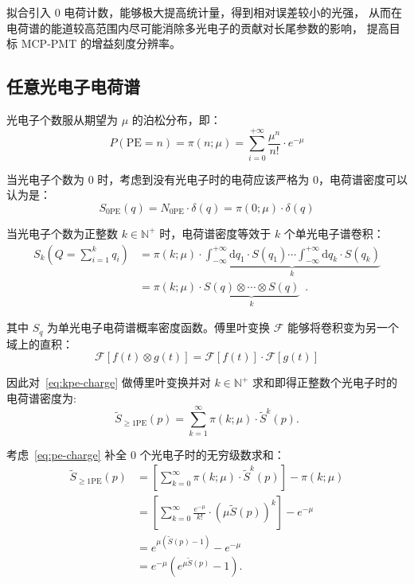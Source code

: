 拟合引入 0 电荷计数，能够极大提高统计量，得到相对误差较小的光强，
从而在电荷谱的能道较高范围内尽可能消除多光电子的贡献对长尾参数的影响，
提高目标 MCP-PMT 的增益刻度分辨率。

\subsection{任意光电子电荷谱}\label{sec:dft}

光电子个数服从期望为 $\mu$ 的泊松分布，即：
\begin{equation}
    P(\text{PE}=n) = \pi(n;\mu)=\sum_{i=0}^{+\infty}\frac{\mu^{n}}{n!}\cdot e^{-\mu}
\end{equation}

当光电子个数为 0 时，考虑到没有光电子时的电荷应该严格为 0，电荷谱密度可以认为是：
\begin{equation}
    S_{0\text{PE}}(q)=N_{0\text{PE}}\cdot\delta(q)=\pi(0;\mu)\cdot\delta(q)
\end{equation}

当光电子个数为正整数 $k\in\mathbb{N}^{+}$ 时，电荷谱密度等效于 $k$ 个单光电子谱卷积：
\begin{align}
    S_{k}(Q = \sum_{i = 1}^{k} q_i ) 
    & = \pi(k;\mu)\cdot\underbrace{
    \int_{-\infty }^{+\infty}\mathrm{d}q_1\cdot S(q_1)
    \cdots \int_{-\infty }^{+\infty}\mathrm{d}q_k\cdot S(q_k)
    }_{k}\\
    &=\pi(k;\mu)\cdot\underbrace{S(q)\otimes\cdots\otimes S(q)}_{k}\enspace.
    \label{eq:kpe-charge}
\end{align}

其中 $S_q$ 为单光电子电荷谱概率密度函数。傅里叶变换 $\mathcal{F}$ 能够将卷积变为另一个域上的直积：
\begin{equation}
    \mathcal{F}\left[f(t)\otimes g(t)\right]=\mathcal{F}[f(t)]\cdot\mathcal{F}[g(t)]
    \label{eq:fourier}
\end{equation}

因此对~\eqref{eq:kpe-charge} 做傅里叶变换并对 $k\in\mathbb{N}^{+}$ 求和即得正整数个光电子时的电荷谱密度为:
\begin{equation}
    \tilde{S}_{\ge1\text{PE}}(p)=\sum_{k=1}^{\infty}
    \pi(k;\mu)\cdot\tilde{S}^k(p).
    \label{eq:pe-charge}
\end{equation}

考虑~\eqref{eq:pe-charge} 补全 0 个光电子时的无穷级数求和：
\begin{align}
    \tilde{S}_{\ge1\text{PE}}(p)
    &=\left[\sum_{k=0}^{\infty}\pi(k;\mu)\cdot\tilde{S}^k(p)\right]-\pi(k;\mu)\\
    &=\left[\sum_{k=0}^{\infty}\frac{e^{-\mu}}{k!}\cdot\left(\mu\tilde{S}(p)\right)^k\right]-e^{-\mu}\\
    &=e^{\mu(\tilde{S}(p)-1)}-e^{-\mu}\\
    &=e^{-\mu}(e^{\mu\tilde{S}(p)}-1).
    \label{eq:postive-charge}
\end{align}

